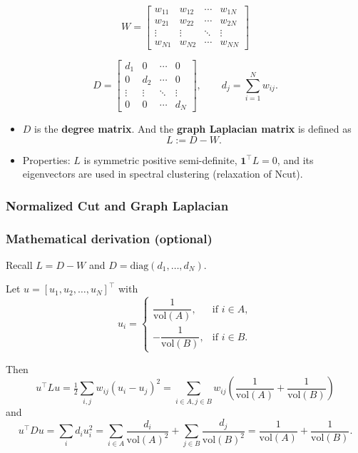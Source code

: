 \documentclass[UTF8]{ctexart}
\begin{document}
\[
W=\begin{bmatrix}
w_{11} & w_{12} & \cdots & w_{1N} \\
w_{21} & w_{22} & \cdots & w_{2N} \\
\vdots & \vdots & \ddots & \vdots \\
w_{N1} & w_{N2} & \cdots & w_{NN}
\end{bmatrix}
\]

\[
D=\begin{bmatrix}
d_1 & 0 & \cdots & 0 \\
0 & d_2 & \cdots & 0 \\
\vdots & \vdots & \ddots & \vdots \\
0 & 0 & \cdots & d_N
\end{bmatrix},\qquad d_j=\sum_{i=1}^N w_{ij}.
\]

\begin{itemize}
    \item $D$ is the \textbf{degree matrix}. And the \textbf{graph Laplacian matrix} is defined as
    \[L:=D-W.
    \]
    \item Properties: $L$ is symmetric positive semi-definite, $\mathbf{1}^\top L=0$, and its eigenvectors are used in spectral clustering (relaxation of Ncut).
\end{itemize}

\subsubsection{Normalized Cut and Graph Laplacian}

\subsubsection*{Mathematical derivation (optional)}

Recall $L=D-W$ and $D=\mathrm{diag}(d_1,\ldots,d_N)$. 

Let $u=[u_1,u_2,\ldots,u_N]^\top$ with
\[
u_i=\begin{cases}
\dfrac{1}{\mathrm{vol}(A)}, &\text{if } i\in A,\\[4pt]
-\dfrac{1}{\mathrm{vol}(B)}, &\text{if } i\in B.
\end{cases}
\]

Then
\[
u^\top L u=\tfrac{1}{2}\sum_{i,j} w_{ij}(u_i-u_j)^2=\sum_{i\in A, j\in B} w_{ij}\left(\frac{1}{\mathrm{vol}(A)}+\frac{1}{\mathrm{vol}(B)}\right)
\]
and
\[
u^\top D u=\sum_i d_i u_i^2=\sum_{i\in A}\frac{d_i}{\mathrm{vol}(A)^2}+\sum_{j\in B}\frac{d_j}{\mathrm{vol}(B)^2}=\frac{1}{\mathrm{vol}(A)}+\frac{1}{\mathrm{vol}(B)}.
\]
\end{document}
